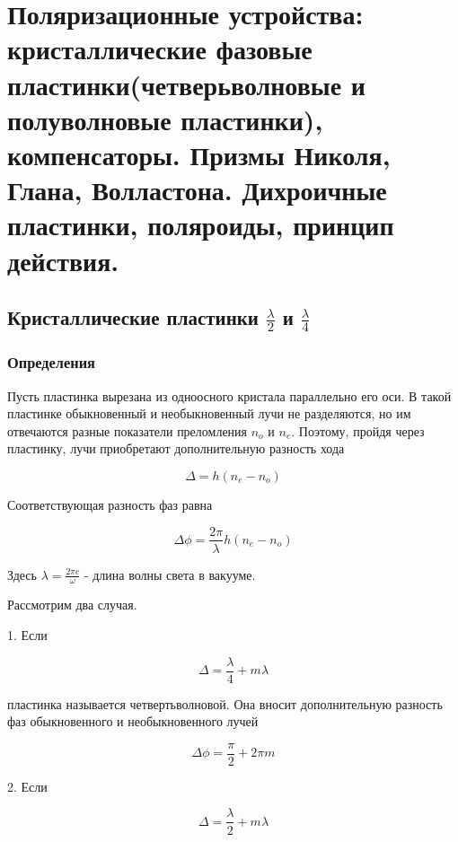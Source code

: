 

\section{Поляризационные устройства: кристаллические фазовые пластинки(четверьволновые и полуволновые пластинки), компенсаторы. Призмы Николя, Глана, Волластона. Дихроичные пластинки, поляроиды, принцип действия.}


\subsection{Кристаллические пластинки $\frac{\lambda}{2}$ и $\frac{\lambda}{4}$}

\subsubsection{Определения}

Пусть пластинка вырезана из одноосного кристала параллельно его оси. В такой пластинке обыкновенный и необыкновенный лучи не разделяются, но им отвечаются разные показатели преломления  $n_o$ и $n_e$. Поэтому, пройдя через пластинку, лучи приобретают дополнительную разность хода

\begin{equation*}
    \Delta = h(n_e - n_o)
\end{equation*}

Соответствующая разность фаз равна

\begin{equation*}
    \Delta \phi = \frac{2\pi}{\lambda}h(n_e - n_o)
\end{equation*}

Здесь $\lambda = \frac{2\pi c}{\omega}$ - длина волны света в вакууме.

Рассмотрим два случая.

1. Если

\begin{equation*}
    \Delta = \frac{\lambda}{4} + m\lambda 
\end{equation*}

пластинка называется четвертьволновой. Она вносит дополнительную разность фаз обыкновенного и необыкновенного лучей

\begin{equation*}
    \Delta \phi = \frac{\pi}{2} + 2\pi m  
\end{equation*}

2. Если

\begin{equation*}
    \Delta = \frac{\lambda}{2} + m\lambda 
\end{equation*}

